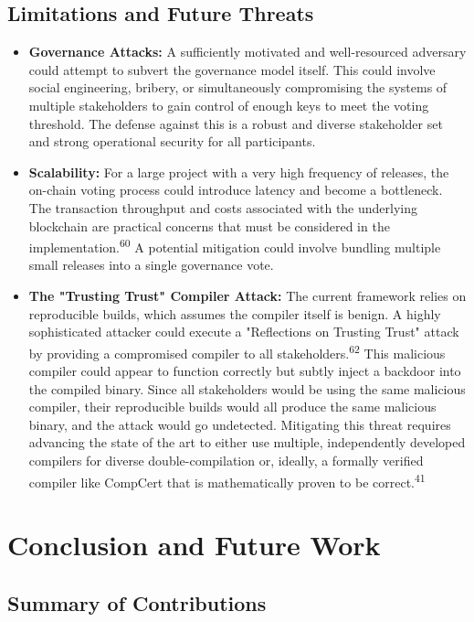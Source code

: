\documentclass{article}
\begin{document}
\subsection{Limitations and Future Threats}

\begin{itemize}
\item \textbf{Governance Attacks:} A sufficiently motivated and well-resourced adversary could attempt to subvert the governance model itself. This could involve social engineering, bribery, or simultaneously compromising the systems of multiple stakeholders to gain control of enough keys to meet the voting threshold. The defense against this is a robust and diverse stakeholder set and strong operational security for all participants.
\item \textbf{Scalability:} For a large project with a very high frequency of releases, the on-chain voting process could introduce latency and become a bottleneck. The transaction throughput and costs associated with the underlying blockchain are practical concerns that must be considered in the implementation.\textsuperscript{60} A potential mitigation could involve bundling multiple small releases into a single governance vote.
\item \textbf{The "Trusting Trust" Compiler Attack:} The current framework relies on reproducible builds, which assumes the compiler itself is benign. A highly sophisticated attacker could execute a "Reflections on Trusting Trust" attack by providing a compromised compiler to all stakeholders.\textsuperscript{62} This malicious compiler could appear to function correctly but subtly inject a backdoor into the compiled binary. Since all stakeholders would be using the same malicious compiler, their reproducible builds would all produce the same malicious binary, and the attack would go undetected. Mitigating this threat requires advancing the state of the art to either use multiple, independently developed compilers for diverse double-compilation or, ideally, a formally verified compiler like CompCert that is mathematically proven to be correct.\textsuperscript{41}
\end{itemize}

\section{Conclusion and Future Work}
\label{sec:conclusion-and-future-work}

\subsection{Summary of Contributions}
\end{document}
